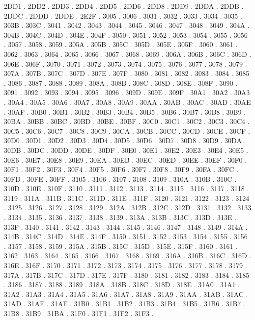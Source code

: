 2DD1 .
2DD2 .
2DD3 .
2DD4 .
2DD5 .
2DD6 .
2DD8 .
2DD9 .
2DDA .
2DDB .
2DDC .
2DDD .
2DDE .
2E2F .
3005 .
3006 .
3031 .
3032 .
3033 .
3034 .
3035 .
303B .
303C .
3041 .
3042 .
3043 .
3044 .
3045 .
3046 .
3047 .
3048 .
3049 .
304A .
304B .
304C .
304D .
304E .
304F .
3050 .
3051 .
3052 .
3053 .
3054 .
3055 .
3056 .
3057 .
3058 .
3059 .
305A .
305B .
305C .
305D .
305E .
305F .
3060 .
3061 .
3062 .
3063 .
3064 .
3065 .
3066 .
3067 .
3068 .
3069 .
306A .
306B .
306C .
306D .
306E .
306F .
3070 .
3071 .
3072 .
3073 .
3074 .
3075 .
3076 .
3077 .
3078 .
3079 .
307A .
307B .
307C .
307D .
307E .
307F .
3080 .
3081 .
3082 .
3083 .
3084 .
3085 .
3086 .
3087 .
3088 .
3089 .
308A .
308B .
308C .
308D .
308E .
308F .
3090 .
3091 .
3092 .
3093 .
3094 .
3095 .
3096 .
309D .
309E .
309F .
30A1 .
30A2 .
30A3 .
30A4 .
30A5 .
30A6 .
30A7 .
30A8 .
30A9 .
30AA .
30AB .
30AC .
30AD .
30AE .
30AF .
30B0 .
30B1 .
30B2 .
30B3 .
30B4 .
30B5 .
30B6 .
30B7 .
30B8 .
30B9 .
30BA .
30BB .
30BC .
30BD .
30BE .
30BF .
30C0 .
30C1 .
30C2 .
30C3 .
30C4 .
30C5 .
30C6 .
30C7 .
30C8 .
30C9 .
30CA .
30CB .
30CC .
30CD .
30CE .
30CF .
30D0 .
30D1 .
30D2 .
30D3 .
30D4 .
30D5 .
30D6 .
30D7 .
30D8 .
30D9 .
30DA .
30DB .
30DC .
30DD .
30DE .
30DF .
30E0 .
30E1 .
30E2 .
30E3 .
30E4 .
30E5 .
30E6 .
30E7 .
30E8 .
30E9 .
30EA .
30EB .
30EC .
30ED .
30EE .
30EF .
30F0 .
30F1 .
30F2 .
30F3 .
30F4 .
30F5 .
30F6 .
30F7 .
30F8 .
30F9 .
30FA .
30FC .
30FD .
30FE .
30FF .
3105 .
3106 .
3107 .
3108 .
3109 .
310A .
310B .
310C .
310D .
310E .
310F .
3110 .
3111 .
3112 .
3113 .
3114 .
3115 .
3116 .
3117 .
3118 .
3119 .
311A .
311B .
311C .
311D .
311E .
311F .
3120 .
3121 .
3122 .
3123 .
3124 .
3125 .
3126 .
3127 .
3128 .
3129 .
312A .
312B .
312C .
312D .
3131 .
3132 .
3133 .
3134 .
3135 .
3136 .
3137 .
3138 .
3139 .
313A .
313B .
313C .
313D .
313E .
313F .
3140 .
3141 .
3142 .
3143 .
3144 .
3145 .
3146 .
3147 .
3148 .
3149 .
314A .
314B .
314C .
314D .
314E .
314F .
3150 .
3151 .
3152 .
3153 .
3154 .
3155 .
3156 .
3157 .
3158 .
3159 .
315A .
315B .
315C .
315D .
315E .
315F .
3160 .
3161 .
3162 .
3163 .
3164 .
3165 .
3166 .
3167 .
3168 .
3169 .
316A .
316B .
316C .
316D .
316E .
316F .
3170 .
3171 .
3172 .
3173 .
3174 .
3175 .
3176 .
3177 .
3178 .
3179 .
317A .
317B .
317C .
317D .
317E .
317F .
3180 .
3181 .
3182 .
3183 .
3184 .
3185 .
3186 .
3187 .
3188 .
3189 .
318A .
318B .
318C .
318D .
318E .
31A0 .
31A1 .
31A2 .
31A3 .
31A4 .
31A5 .
31A6 .
31A7 .
31A8 .
31A9 .
31AA .
31AB .
31AC .
31AD .
31AE .
31AF .
31B0 .
31B1 .
31B2 .
31B3 .
31B4 .
31B5 .
31B6 .
31B7 .
31B8 .
31B9 .
31BA .
31F0 .
31F1 .
31F2 .
31F3 .
